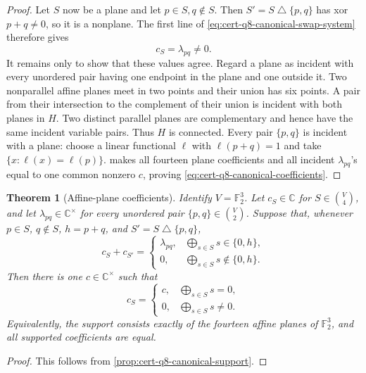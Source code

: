 \documentclass[11pt,letterpaper,onecolumn]{article}
\theoremstyle{plain}
\newtheorem{theorem}{Theorem}[section]
\theoremstyle{definition}
\theoremstyle{remark}
\begin{document}
\begin{proof}
		Let \(S\) now be a plane and let \(p\in S,q\notin S\).  Then
		\(S'=S\mathbin\triangle\{p,q\}\) has xor \(p+q\ne0\), so it is a nonplane.
		The first line of \cref{eq:cert-q8-canonical-swap-system} therefore gives
		\begin{equation}
			c_S=\lambda_{pq}\ne0.
			\label{eq:cert-q8-plane-pair-value}
		\end{equation}
		It remains only to show that these values agree.  Regard a plane as
		incident with every unordered pair having one endpoint in the plane and
		one outside it.  Two nonparallel affine planes meet in two points and their
		union has six points. A pair from their intersection to the complement of
		their union is incident with both planes in \(H\).  Two distinct
		parallel planes are complementary and hence have the same incident variable
		pairs.  Thus \(H\) is connected.  Every pair \(\{p,q\}\) is incident
		with a plane:
		choose a linear functional \(\ell\) with \(\ell(p+q)=1\) and take
		\(\{x:\ell(x)=\ell(p)\}\).
		 makes all fourteen plane coefficients
		and all incident \(\lambda_{pq}\)'s equal to one common nonzero \(c\),
		proving \cref{eq:cert-q8-canonical-coefficients}.
	\end{proof}
	

    \begin{theorem}[Affine-plane coefficients]
		\label{thm:cert-q8-canonical-support-interface}
		Identify \(V=\mathbb F_2^3\).  Let
		\(c_S\in\mathbb C\) for \(S\in\binom V4\), and let
		\(\lambda_{pq}\in\mathbb C^\times\) for every unordered pair
		\(\{p,q\}\in\binom V2\).  Suppose that, whenever \(p\in S\), \(q\notin S\),
		\(h=p+q\), and \(S'=S\mathbin\triangle\{p,q\}\),
		\[
		c_S+c_{S'}=
		\begin{cases}
			\lambda_{pq},&\displaystyle\bigoplus_{s\in S}s\in\{0,h\},\\
			0,&\displaystyle\bigoplus_{s\in S}s\notin\{0,h\}.
		\end{cases}
		\]
		Then there is one \(c\in\mathbb C^\times\) such that
		\[
		c_S=
		\begin{cases}
			c,&\displaystyle\bigoplus_{s\in S}s=0,\\
			0,&\displaystyle\bigoplus_{s\in S}s\ne0.
		\end{cases}
		\]
		Equivalently, the support consists exactly of the fourteen affine planes of
		\(\mathbb F_2^3\), and all supported coefficients are equal.
	\end{theorem}
	
	\begin{proof}
		This follows from
		\cref{prop:cert-q8-canonical-support}.
	\end{proof}
	
\end{document}
